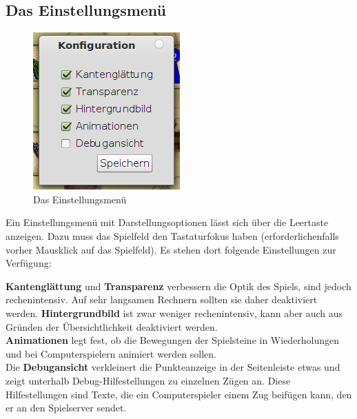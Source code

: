\documentclass[a4paper, ngerman]{scrartcl}
\begin{document}
\subsection{Das Einstellungsmenü}
	 \begin{figure}[h]
		\centering
		\includegraphics[scale=0.5]{images/configuration}
		\caption{Das Einstellungsmenü}
		\label{fig:Configuration}
	\end{figure}	
Ein Einstellungsmenü mit Darstellungsoptionen lässt
sich über die Leertaste anzeigen. Dazu muss das
Spielfeld den Tastaturfokus haben (erforderlichenfalls
vorher Mausklick auf das Spielfeld). Es stehen dort
folgende Einstellungen zur Verfügung:

\textbf{Kantenglättung} und \textbf{Transparenz} verbessern die Optik des
Spiels, sind jedoch rechenintensiv. Auf sehr langsamen Rechnern sollten sie daher
deaktiviert werden. \textbf{Hintergrundbild} ist zwar weniger rechenintensiv,
kann aber auch aus Gründen der Übersichtlichkeit deaktiviert werden.\\
\textbf{Animationen} legt fest, ob die Bewegungen der Spielsteine in
Wiederholungen und bei Computerspielern animiert werden sollen.\\
Die \textbf{Debugansicht} verkleinert die Punkteanzeige in der Seitenleiste
etwas und zeigt unterhalb Debug-Hilfestellungen zu einzelnen Zügen an. Diese
Hilfestellungen sind Texte, die ein Computerspieler einem Zug beifügen kann, den er
an den Spielserver sendet.
	
\end{document}
